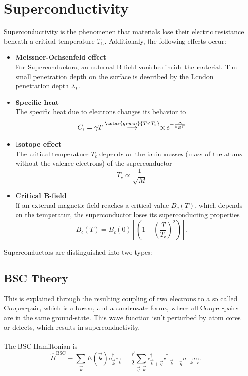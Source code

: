 \documentclass{article}
\newcommand{\lr}[1]{\left(#1\right)}
\newcommand{\lreck}[1]{\left[#1\right]}
\newcommand{\comment}[1]{{\color{gruen} {#1}}}
\begin{document}
\newpage


\section{Superconductivity}
Superconductivity is the phenomenen that materials lose their electric resistance beneath a critical temperature $T_C$. Additionaly, the following effects occur:
	\begin{itemize}
		\item \textbf{Meissner-Ochsenfeld effect}\\
		For Superconductors, an external B-field vanishes inside the material. The small penetration depth on the surface is described by the London penetration depth $\lambda_L$.
		
		
		\item \textbf{Specific heat}\\
		The specific heat due to electrons changes its behavior to
			\begin{equation}
				C_e = \gamma T \stackrel{\comment{T<T_c}}{\longrightarrow} \propto e^{-\frac{\Delta}{k_B T}}
			\end{equation}
		
		
		\item \textbf{Isotope effect}\\
		The critical temperature $T_c$ depends on the ionic masses \textcolor{gruen}{(mass of the atoms without the valence electrons)} of the superconductor
			\begin{equation}
				T_c \propto \frac{1}{\sqrt{M}}
			\end{equation}
		
		
		\item \textbf{Critical B-field}\\
		If an external magnetic field reaches a critical value $B_c(T)$, which depends on the temperatur, the superconductor loses its superconducting properties
			\begin{equation}
				B_c(T) = B_c(0) \lreck{ \lr{ 1 - \lr{\frac{T}{T_c}}^2 } }.
			\end{equation}
	\end{itemize}

Superconductors are distinguished into two types:


\subsection{BSC Theory}
This is explained through the resulting coupling of two electrons to a so called Cooper-pair, which is a boson, and a condensate forms, where all Cooper-pairs are in the same ground-state. This wave function isn't perturbed by atom cores or defects, which results in superconductivity.\\
\\
The BSC-Hamiltonian is
	\begin{equation}
		\hat{H}^\text{BSC} = \sum_{\vec{k}} E(\vec{k}) c_{\vec{k}}^\dagger c_{\vec{k}} - \frac{V}{2} \sum_{\vec{q}, \vec{k}} c_{\vec{k}+\vec{q}}^\dagger c_{-\vec{k} - \vec{q}}^\dagger c_{-\vec{k}} c_{\vec{k}}.
	\end{equation}
\end{document}
